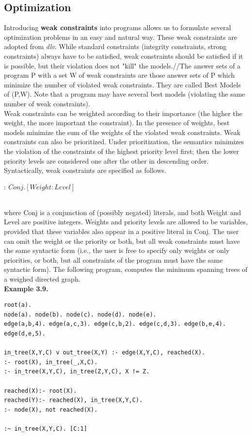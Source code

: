 \documentclass[14pt,a4paper, titlepage]{article}
\begin{document}
\subsection{Optimization}
Introducing \textbf{weak constraints} into \hex programs allows us to formulate several optimization problems in an easy and natural way. These weak constraints are adopted from \textit{dlv}. While standard constraints (integrity constraints, strong constraints) always have to be satisfied, weak constraints should be satisfied if it is possible, but their violation does not "kill" the models.//The answer sets of a program P with a set W of weak constraints are those answer sets of P which minimize the number of violated weak constraints. They are called Best Models of (P,W). Note that a program may have several best models (violating the same number of weak constraints).\\ Weak constraints can be weighted according to their importance (the higher the weight, the more important the constraint). In the presence of weights, best models minimize the sum of the weights of the violated weak constraints. Weak constraints can also be prioritized. Under prioritization, the semantics minimizes the violation of the constraints of the highest priority level first; then the lower priority levels are considered one after the other in descending order. Syntactically, weak constraints are specified as follows. \\ \centerline{$:~ Conj. [Weight:Level]$} \\ where Conj is a conjunction of (possibly negated) literals, and both Weight and Level are positive integers. Weights and priority levels are allowed to be variables, provided that these variables also appear in a positive literal in Conj. The user can omit the weight or the priority or both, but all weak constraints must have the same syntactic form (i.e., the user is free to specify only weights or only priorities, or both, but all constraints of the program must have the same syntactic form)\cite{dlvum}.
The following program, computes the minimum spanning trees of a weighed directed graph.
\\ \textbf{Example 3.9.}
\begin{lstlisting}
root(a).
node(a). node(b). node(c). node(d). node(e).
edge(a,b,4). edge(a,c,3). edge(c,b,2). edge(c,d,3). edge(b,e,4). edge(d,e,5).

in_tree(X,Y,C) v out_tree(X,Y) :- edge(X,Y,C), reached(X).
:- root(X), in_tree(_,X,C).
:- in_tree(X,Y,C), in_tree(Z,Y,C), X != Z.

reached(X):- root(X).
reached(Y):- reached(X), in_tree(X,Y,C).
:- node(X), not reached(X).

:~ in_tree(X,Y,C). [C:1]
\end{lstlisting}
\end{document}
